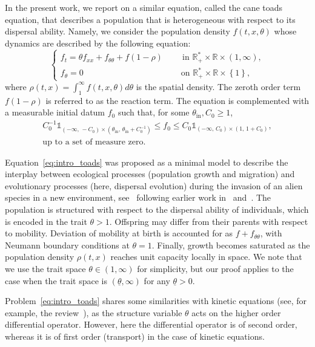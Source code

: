 \documentclass[AHL,Unicode,longabstracts]{cedram}
\newcommand{\rmin}{\mathrm{in}}
\newcommand{\R}{\mathbb{R}}
\newcommand{\1}{\mathds{1}}
\begin{document}
In the present work, we report on a similar equation, called the cane toads equation, that describes a population that is heterogeneous with respect to its dispersal ability. Namely, we consider the population density $f(t,x,\theta)$ whose dynamics are described by the following equation:
\begin{equation}\label{eq:intro_toads}
\begin{cases}
f_t = \theta f_{xx} + f_{\theta\theta} + f(1-\rho) \quad &\,\text{ in } \R_+^* \times \R \times (1,\infty),\\%
f_\theta = 0 & \text{ on } \R_+^*\times \R\times \left\{1\right\},
\end{cases}
\end{equation}
where $\rho(t,x) = \int_{1}^\infty f(t,x,\theta) d\theta$ is the spatial density. The zeroth order term $f(1-\rho)$ is referred to as the reaction term. The equation is complemented with a measurable initial datum $f_0$ such that, for some $\theta_{\rmin}, C_0\geq 1$,
\begin{multline}\label{eq:initial_data}
C_0^{-1}\1_{\left(-\infty,\, - C_0\right) \times \left(\theta_{\rmin},\,\theta_{\rmin} + C_0^{-1}\right)}
\leq f_0
\leq C_0 \1_{\left(-\infty,\,C_0\right) \times \left(1,\,1 + C_0\right)},\\
\text{up to a set of measure zero}.
\end{multline}

Equation~\eqref{eq:intro_toads} was proposed as a minimal model to describe the interplay between ecological processes (population growth and migration) and evolutionary processes (here, dispersal evolution) during the invasion of an alien species in a new environment, see~\cite{BenichouEtAl} following earlier work in~\cite{ChampagnatMeleard} and~\cite{ArnoldDesvillettesPrevost}. The population is structured with respect to the dispersal ability of individuals, which is encoded in the trait $\theta>1$. Offspring may differ from their parents with respect to mobility. Deviation of mobility at birth is accounted for as $f + f_{\theta\theta}$, with Neumann boundary conditions at $\theta = 1$. Finally, growth becomes saturated as the population density $\rho(t,x)$ reaches unit capacity locally in space. We note that we use the trait space $\theta \in (1,\infty)$ for simplicity, but our proof applies to the case when the trait space is $(\underline\theta, \infty)$ for any $\underline\theta>0$.


Problem~\eqref{eq:intro_toads} shares some similarities with kinetic equations (see, for example, the review~\cite{Villani}), as the structure variable $\theta$ acts on the higher order differential operator. However, here the differential operator is of second order, whereas it is of first order (transport) in the case of kinetic equations.
\end{document}
